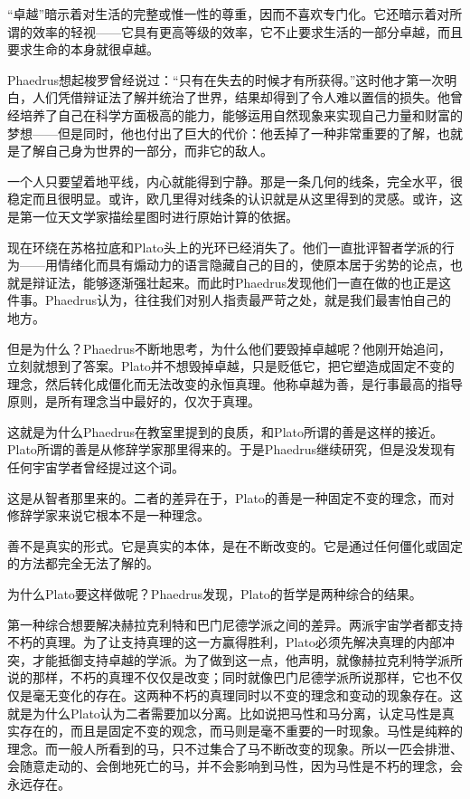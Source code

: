 \documentclass[UTF8]{article}
\begin{document}
\par “卓越”暗示着对生活的完整或惟一性的尊重，因而不喜欢专门化。它还暗示着对所谓的效率的轻视——它具有更高等级的效率，它不止要求生活的一部分卓越，而且要求生命的本身就很卓越。
\par Phaedrus想起梭罗曾经说过：“只有在失去的时候才有所获得。”这时他才第一次明白，人们凭借辩证法了解并统治了世界，结果却得到了令人难以置信的损失。他曾经培养了自己在科学方面极高的能力，能够运用自然现象来实现自己力量和财富的梦想——但是同时，他也付出了巨大的代价：他丢掉了一种非常重要的了解，也就是了解自己身为世界的一部分，而非它的敌人。
\par 一个人只要望着地平线，内心就能得到宁静。那是一条几何的线条，完全水平，很稳定而且很明显。或许，欧几里得对线条的认识就是从这里得到的灵感。或许，这是第一位天文学家描绘星图时进行原始计算的依据。
\par 现在环绕在苏格拉底和Plato头上的光环已经消失了。他们一直批评智者学派的行为——用情绪化而具有煽动力的语言隐藏自己的目的，使原本居于劣势的论点，也就是辩证法，能够逐渐强壮起来。而此时Phaedrus发现他们一直在做的也正是这件事。Phaedrus认为，往往我们对别人指责最严苛之处，就是我们最害怕自己的地方。
\par 但是为什么？Phaedrus不断地思考，为什么他们要毁掉卓越呢？他刚开始追问，立刻就想到了答案。Plato并不想毁掉卓越，只是贬低它，把它塑造成固定不变的理念，然后转化成僵化而无法改变的永恒真理。他称卓越为善，是行事最高的指导原则，是所有理念当中最好的，仅次于真理。
\par 这就是为什么Phaedrus在教室里提到的良质，和Plato所谓的善是这样的接近。Plato所谓的善是从修辞学家那里得来的。于是Phaedrus继续研究，但是没发现有任何宇宙学者曾经提过这个词。
\par 这是从智者那里来的。二者的差异在于，Plato的善是一种固定不变的理念，而对修辞学家来说它根本不是一种理念。
\par 善不是真实的形式。它是真实的本体，是在不断改变的。它是通过任何僵化或固定的方法都完全无法了解的。
\par 为什么Plato要这样做呢？Phaedrus发现，Plato的哲学是两种综合的结果。
\par 第一种综合想要解决赫拉克利特和巴门尼德学派之间的差异。两派宇宙学者都支持不朽的真理。为了让支持真理的这一方赢得胜利，Plato必须先解决真理的内部冲突，才能抵御支持卓越的学派。为了做到这一点，他声明，就像赫拉克利特学派所说的那样，不朽的真理不仅仅是改变；同时就像巴门尼德学派所说那样，它也不仅仅是毫无变化的存在。这两种不朽的真理同时以不变的理念和变动的现象存在。这就是为什么Plato认为二者需要加以分离。比如说把马性和马分离，认定马性是真实存在的，而且是固定不变的观念，而马则是毫不重要的一时现象。马性是纯粹的理念。而一般人所看到的马，只不过集合了马不断改变的现象。所以一匹会排泄、会随意走动的、会倒地死亡的马，并不会影响到马性，因为马性是不朽的理念，会永远存在。
\end{document}
